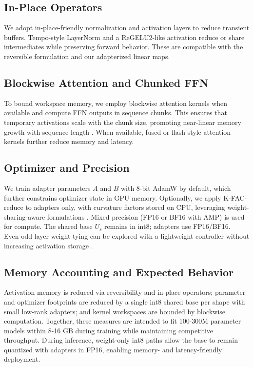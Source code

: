 \documentclass{article}
\begin{document}
\subsection{In-Place Operators}
We adopt in-place-friendly normalization and activation layers to reduce transient buffers. Tempo-style LayerNorm and a ReGELU2-like activation reduce or share intermediates while preserving forward behavior. These are compatible with the reversible formulation and our adapterized linear maps.

\subsection{Blockwise Attention and Chunked FFN}
To bound workspace memory, we employ blockwise attention kernels when available and compute FFN outputs in sequence chunks. This ensures that temporary activations scale with the chunk size, promoting near-linear memory growth with sequence length \cite{liu-2023-blockwise}. When available, fused or flash-style attention kernels further reduce memory and latency.

\subsection{Optimizer and Precision}
We train adapter parameters \(A\) and \(B\) with 8-bit AdamW by default, which further constrains optimizer state in GPU memory. Optionally, we apply K-FAC-reduce to adapters only, with curvature factors stored on CPU, leveraging weight-sharing-aware formulations \cite{eschenhagen-2023-kronecker}. Mixed precision (FP16 or BF16 with AMP) is used for compute. The shared base \(U_s\) remains in int8; adapters use FP16/BF16. Even-odd layer weight tying can be explored with a lightweight controller without increasing activation storage \cite{hay-2024-dynamic}.

\subsection{Memory Accounting and Expected Behavior}
Activation memory is reduced via reversibility and in-place operators; parameter and optimizer footprints are reduced by a single int8 shared base per shape with small low-rank adapters; and kernel workspaces are bounded by blockwise computation. Together, these measures are intended to fit 100-300M parameter models within 8-16 GB during training while maintaining competitive throughput. During inference, weight-only int8 paths allow the base to remain quantized with adapters in FP16, enabling memory- and latency-friendly deployment.
\end{document}
